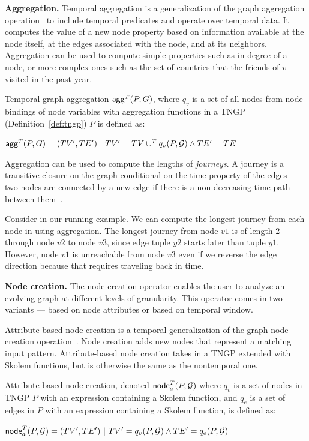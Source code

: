 {\bf Aggregation.}  Temporal aggregation is a generalization of the
graph aggregation operation~\cite{Wood2012} to include temporal
predicates and operate over temporal data.  It computes the value of a
new node property based on information available at the node itself,
at the edges associated with the node, and at its neighbors.
Aggregation can be used to compute simple properties such as in-degree
of a node, or more complex ones such as the set of countries that the
friends of $v$ visited in the past year.

\begin{definition}[Aggregation]
\label{def:tgagg}
Temporal graph aggregation $\textsf{agg}^T(P,G)$, where $q_v$ is a set
of all nodes from node bindings of node variables with aggregation
functions in a TNGP (Definition~\ref{def:tngp}) $P$ is defined as:

$\textsf{agg}^T(P,G) = (TV',TE') ~|~ TV' = TV \cup^T q_v(P,\mathcal{G}) \land TE' = TE$
\end{definition}

Aggregation can be used to compute the lengths of {\em journeys}.  A
journey is a transitive closure on the graph conditional on the time
property of the edges -- two nodes are connected by a new edge if
there is a non-decreasing time path between
them~\cite{Casteigts2011,Ferreira2004}.

\begin{example}
Consider \tg \ttt in our running example.  We can compute the longest
journey from each node in \ttt using aggregation.  The longest journey
from node $v1$ is of length 2 through node $v2$ to node $v3$, since
edge tuple $y2$ starts later than tuple $y1$.  However, node $v1$ is
unreachable from node $v3$ even if we reverse the edge direction because
that requires traveling back in time.
\end{example}

{\bf Node creation.}  The node creation operator enables the user to
analyze an evolving graph at different levels of granularity.  This
operator comes in two variants --- based on node attributes or based
on temporal window.

Attribute-based node creation is a temporal generalization of the
graph node creation operation~\cite{Wood2012}.  Node creation adds new
nodes that represent a matching input pattern.  Attribute-based node
creation takes in a TNGP extended with Skolem functions, but is
otherwise the same as the nontemporal one.

\begin{definition}
\label{def:nodecra}
Attribute-based node creation, denoted $\textsf{node}^T_a(P,\mathcal{G})$
where $q_v$ is a set of nodes in TNGP $P$ with an expression containing a
Skolem function, and $q_e$ is a set of edges in $P$ with an expression
containing a Skolem function, is defined as:

$\textsf{node}^T_a(P,\mathcal{G}) = (TV',TE') ~|~ TV' = q_v(P,\mathcal{G}) \land TE' = q_e(P,\mathcal{G})$
\end{definition}

